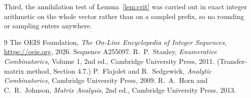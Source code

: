 \documentclass[11pt,a4paper]{article}
\theoremstyle{plain}
\theoremstyle{definition}
\begin{document}
Third, the annihilation test of Lemma~\ref{lem:crit} was carried out in exact integer
arithmetic on the whole vector rather than on a sampled prefix, so no rounding or sampling
enters anywhere.

\begin{thebibliography}{9}
 The OEIS Foundation, \emph{The On-Line Encyclopedia of Integer
Sequences}, \url{https://oeis.org}, 2026. Sequence A255097.
 R.~P.~Stanley, \emph{Enumerative Combinatorics}, Volume 1, 2nd ed.,
Cambridge University Press, 2011. (Transfer-matrix method, Section 4.7.)
 P.~Flajolet and R.~Sedgewick, \emph{Analytic Combinatorics}, Cambridge
University Press, 2009.
 R.~A.~Horn and C.~R.~Johnson, \emph{Matrix Analysis}, 2nd ed., Cambridge
University Press, 2013.
\end{thebibliography}
\end{document}
